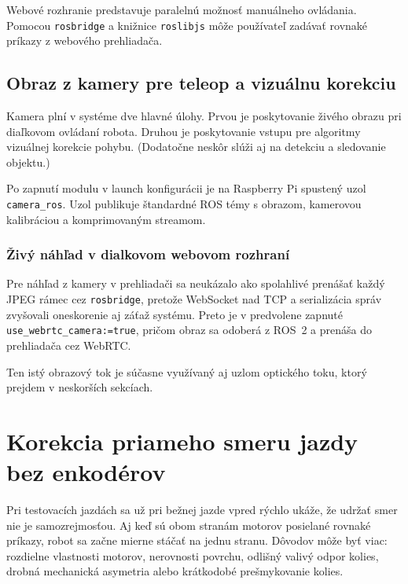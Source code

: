         Webové rozhranie predstavuje paralelnú možnosť manuálneho ovládania. Pomocou \texttt{rosbridge} a knižnice \texttt{roslibjs} môže používateľ zadávať rovnaké príkazy z webového prehliadača.
      
        \subsection{Obraz z kamery pre teleop a vizuálnu korekciu}
        \label{sec:kamera-rpi5-ros2}
      
        Kamera plní v systéme dve hlavné úlohy. Prvou je poskytovanie živého obrazu pri diaľkovom ovládaní robota. Druhou je poskytovanie vstupu pre algoritmy vizuálnej korekcie pohybu. (Dodatočne neskôr slúži aj na detekciu a sledovanie objektu.)
      
        Po zapnutí modulu v launch konfigurácii je na Raspberry Pi spustený uzol \texttt{camera\_ros}. Uzol publikuje štandardné ROS témy s obrazom, kamerovou kalibráciou a komprimovaným streamom.
      
        \subsubsection{Živý náhľad v dialkovom webovom rozhraní}
        \label{sec:web-camera-webrtc}
      
        Pre náhľad z kamery v prehliadači sa neukázalo ako spolahlivé prenášať každý JPEG rámec cez \texttt{rosbridge}, pretože WebSocket nad TCP a serializácia správ zvyšovali oneskorenie aj záťaž systému. Preto je v  predvolene zapnuté \texttt{use\_webrtc\_camera:=true}, pričom obraz sa odoberá z ROS~2 a prenáša do prehliadača cez WebRTC.
      
        Ten istý obrazový tok je súčasne využívaný aj uzlom optického toku, ktorý prejdem v neskorších sekcíach.
      
        \section{Korekcia priameho smeru jazdy bez enkodérov}
        \label{sec:korekcia-smer-jazdy}
      
        Pri testovacích jazdách sa už pri bežnej jazde vpred rýchlo ukáže, že udržať smer nie je samozrejmosťou. Aj keď sú obom stranám motorov posielané rovnaké príkazy, robot sa začne mierne stáčať na jednu stranu. Dôvodov môže byť viac: rozdielne vlastnosti motorov, nerovnosti povrchu, odlišný valivý odpor kolies, drobná mechanická asymetria alebo krátkodobé prešmykovanie kolies.
      
